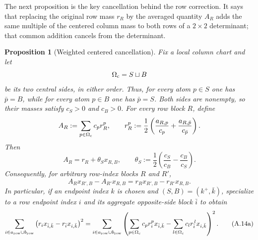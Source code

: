 \documentclass[11pt]{article}
\newtheorem{proposition}[theorem]{Proposition}
\begin{document}
The next proposition is the key cancellation behind the row correction.  It
says that replacing the original row mass $r_R$ by the averaged quantity
$A_R$ adds the same multiple of the centered column mass to both rows of a
$2\times2$ determinant; that common addition cancels from the determinant.

\begin{proposition}[Weighted centered cancellation]\label{prop:weighted-centered-cancellation}
Fix a local column chart and let
\[
 \Omega_{\rm c}=S\sqcup B
\]
be its two central sides, in either order.  Thus, for every atom $p\in S$
one has $\bar p=B$, while for every atom $p\in B$ one has $\bar p=S$.
Both sides are nonempty, so their masses satisfy $c_S>0$ and $c_B>0$.
For every row block $R$, define
\[
A_R:=\sum_{p\in\Omega_{\rm c}}c_p r_R^p,
\qquad
r_R^p:=\frac12\left(
\frac{a_{R,p}}{c_p}+\frac{a_{R,\bar p}}{c_{\bar p}}
\right).
\]
Then
\[
A_R=r_R+\theta_S x_{R,B},
\qquad
\theta_S:=\frac12\left(
\frac{c_S}{c_B}-\frac{c_B}{c_S}
\right).
\]
Consequently, for arbitrary row-index blocks $R$ and $R'$,
\[
A_R x_{R',B}-A_{R'}x_{R,B}
=
r_R x_{R',B}-r_{R'}x_{R,B}.
\]
In particular, if an endpoint index $k$ is chosen and
$(S,B)=(k^+,\bar k)$, specialize to a row endpoint index $i$ and its
aggregate opposite-side block $\bar i$ to obtain
\begin{equation}\label{eq:weighted-centered-cancellation-specialized}
\sum_{i\in a_{\rm row}\cup b_{\rm row}}
\left(r_i x_{\bar i,\bar k}-r_{\bar i}x_{i,\bar k}\right)^2
=
\sum_{i\in a_{\rm row}\cup b_{\rm row}}
\left(
\sum_{p\in\Omega_{\rm c}} c_pr_i^p x_{\bar i,\bar k}
-
\sum_{l\in\Omega_{\rm c}} c_lr_{\bar i}^{\,l}x_{i,\bar k}
\right)^2.
\tag{A.14a}
\end{equation}
\end{proposition}
\end{document}
